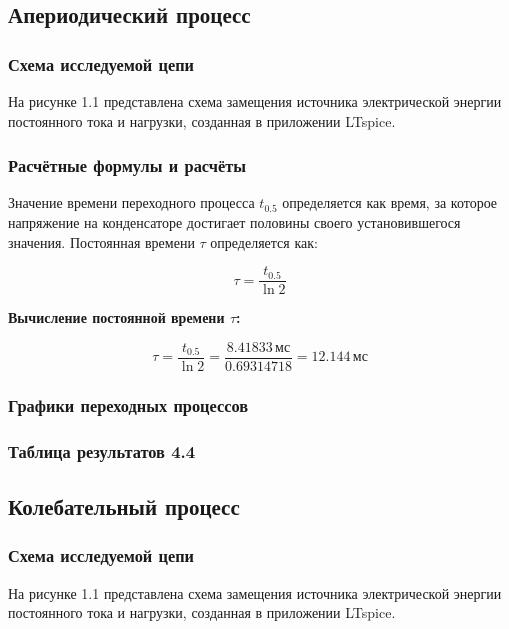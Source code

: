 \subsection{Апериодический процесс}

\subsubsection{Схема исследуемой цепи}
На рисунке 1.1 представлена схема замещения источника электрической энергии постоянного тока и нагрузки, созданная в приложении LTspice.


\subsubsection{Расчётные формулы и расчёты}

Значение времени переходного процесса \( t_{0.5} \) определяется как время, за которое напряжение на конденсаторе достигает половины своего установившегося значения. Постоянная времени \( \tau \) определяется как:

\[
\tau = \frac{t_{0.5}}{\ln 2}
\]

\textbf{Вычисление постоянной времени \( \tau \):}

\[
\tau = \frac{t_{0.5}}{\ln 2} = \frac{8.41833 \, \text{мс}}{0.69314718} = 12.144 \, \text{мс}
\]

\subsubsection{Графики переходных процессов}

\subsubsection{Таблица результатов 4.4}

\subsection{Колебательный процесс}

\subsubsection{Схема исследуемой цепи}
На рисунке 1.1 представлена схема замещения источника электрической энергии постоянного тока и нагрузки, созданная в приложении LTspice.

